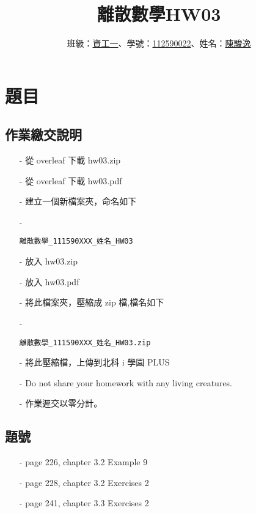 \documentclass[sigconf]{acmart}
\begin{document}
\title{離散數學HW03}

\author{班級：\underline{資工一}、學號：\underline{112590022}、姓名：\underline{陳駿逸}}
\orcid{}
\affiliation{%
  \institution{}
  \city{}
  \country{}
}

\maketitle



\section{題目}
\subsection{作業繳交說明}
\begin{shaded}
\begin{itemize}
    \item[-] 從 overleaf 下載 hw03.zip
    \item[-] 從 overleaf 下載 hw03.pdf
    \item[-] 建立一個新檔案夾，命名如下
    \item[-] \color{red}\begin{verbatim}離散數學_111590XXX_姓名_HW03\end{verbatim}
    \item[-] \color{black}放入 hw03.zip
    \item[-] 放入 hw03.pdf
    \item[-] 將此檔案夾，壓縮成 zip 檔,檔名如下
    \item[-] \color{red}\begin{verbatim}離散數學_111590XXX_姓名_HW03.zip\end{verbatim}
    \item[-] \color{black}將此壓縮檔，上傳到北科 i 學園 PLUS
    \item[-] Do not share your homework with any living creatures.
    \item[-] 作業遲交以零分計。
\end{itemize}
\end{shaded}

\subsection{題號}
\begin{shaded}
\begin{itemize}
        \item[-] page 226, chapter 3.2 Example 9
	\item[-] page 228, chapter 3.2 Exercises 2
	\item[-] page 241, chapter 3.3 Exercises 2
\end{itemize}
\end{shaded}
\end{document}
